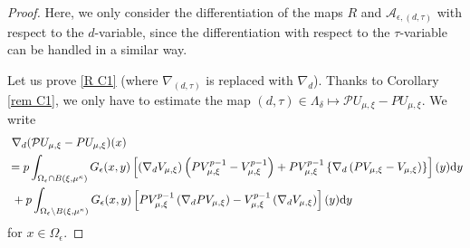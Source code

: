 \documentclass[reqno]{amsart}
\theoremstyle{remark}
\newcommand{\ep}{\epsilon}
\newcommand{\mca}{\mathcal{A}}
\newcommand{\mcp}{\mathcal{P}}
\newcommand{\dy}{\textup{d}y}
\newcommand{\mx}{{\mu,\xi}}
\renewcommand{\(}{\left(}
\renewcommand{\)}{\right)}
\numberwithin{equation}{section}
\begin{document}
\begin{proof}
Here, we only consider the differentiation of the maps $R$ and $\mca_{\ep,(d,\tau)}$ with respect to the $d$-variable,
since the differentiation with respect to the $\tau$-variable can be handled in a similar way.

\medskip
Let us prove \eqref{R C1} (where $\nabla_{(d,\tau)}$ is replaced with $\nabla_d$).
Thanks to Corollary \ref{rem C1}, we only have to estimate the map $(d,\tau) \in \Lambda_\delta \mapsto \mcp U_\mx-PU_\mx$. We write
\begin{equation}\label{der est}
\begin{aligned}
&\ \nabla_d(\mcp U_\mx-PU_\mx)(x) \\
&= p\int_{\Omega_\ep \cap B(\xi,\mu^\kappa)} G_\ep(x,y) \left[\(\nabla_d V_\mx\) \(PV_\mx^{p-1}-V_\mx^{p-1}\) + PV_\mx^{p-1} \left\{\nabla_d\(PV_\mx-V_\mx\)\right\}\right](y)\dy \\
&\ +p\int_{\Omega_\ep \setminus B(\xi,\mu^\kappa)} G_\ep(x,y) \left[PV_\mx^{p-1} \(\nabla_d PV_\mx\) - V_\mx^{p-1} \(\nabla_d V_\mx\)\right](y)\dy
\end{aligned}
\end{equation}
for $x \in \Omega_\ep$.


\end{proof}
\end{document}

